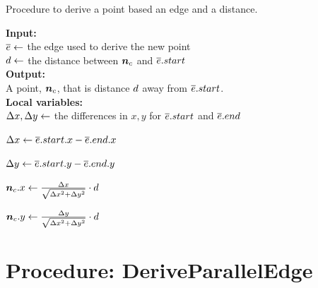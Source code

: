     \begin{algorithm}[h!]
        \caption{Procedure to derive a point based an edge and a distance.}\label{alg:derive corridor point}
        \textbf{Input:} \\
        $ \protect\overline{e} \gets $ the edge used to derive the new point \\
        $ d \gets $ the distance between $ \PointP $ and $ \protect\overline{e}.start $ \\

        \textbf{Output:} \\
        A point, $ \PointP $, that is distance $ d $ away from $ \protect\overline{e}.start $. \\
    
        \textbf{Local variables:} \\
        $ \Delta x, \Delta y \gets $ the differences in $ x, y $ for $ \protect\overline{e}.start $ and $ \protect\overline{e}.end $ \\
    
        \begin{algorithmic}[1]
                \State $ \Delta x \gets \protect\overline{e}.start.x - \protect\overline{e}.end.x $
    
                \State $ \Delta y \gets \protect\overline{e}.start.y - \protect\overline{e}.end.y $
    
                \State $ \bm{n}_c.x \gets \frac{\Delta x}{\sqrt{\Delta x^2 + \Delta y^2}} \cdot d $
    
                \State $ \bm{n}_c.y \gets \frac{\Delta y}{\sqrt{\Delta x^2 + \Delta y^2}} \cdot d $
    
            \State \Return{$ \PointP $}
    
            \EndProcedure
    
        \end{algorithmic}
    \end{algorithm}
    

\section{Procedure: DeriveParallelEdge}


